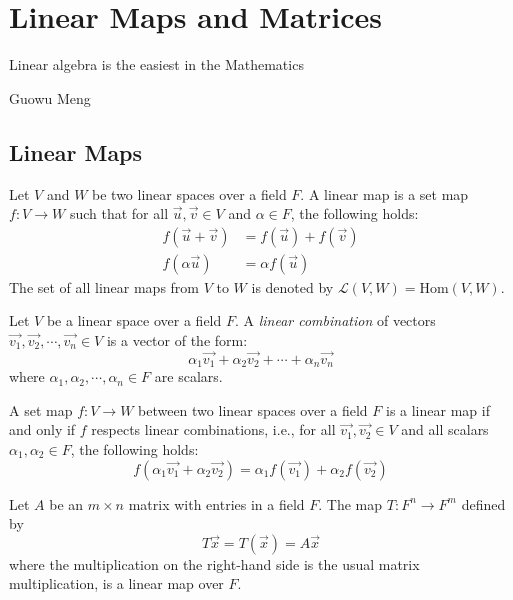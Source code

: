 \documentclass[
	11pt, %
	fleqn, %
	a4paper, %
]{LegrandOrangeBook}
\newcommand{\Hom}[2]{\text{Hom}(#1, #2)} %
\begin{document}
\chapter{Linear Maps and Matrices}

\epigraph{Linear algebra is the easiest in the Mathematics}{Guowu Meng}

\section{Linear Maps}

\begin{definition}
    Let $V$ and $W$ be two linear spaces over a field $F$. A linear map is a set map $f: V \to W$ such that for all $\vec{u}, \vec{v} \in V$ and $\alpha \in F$, the following holds:
    \[
        \begin{split}
            f(\vec{u} + \vec{v}) &= f(\vec{u}) + f(\vec{v}) \\
            f(\alpha \vec{u}) &= \alpha f(\vec{u})
        \end{split}
    \]
    The set of all linear maps from $V$ to $W$ is denoted by $\mathcal{L}(V, W) = \Hom{V}{W}$.
\end{definition}

\begin{definition}
    Let $V$ be a linear space over a field $F$. A \emph{linear combination} of vectors $\vec{v_1}, \vec{v_2}, \cdots, \vec{v_n} \in V$ is a vector of the form:
    \[
        \alpha_1 \vec{v_1} + \alpha_2 \vec{v_2} + \cdots + \alpha_n \vec{v_n}
    \]
    where $\alpha_1, \alpha_2, \cdots, \alpha_n \in F$ are scalars.
\end{definition}

\begin{corollary}
    A set map $f: V \to W$ between two linear spaces over a field $F$ is a linear map if and only if $f$ respects linear combinations, i.e., for all $\vec{v_1}, \vec{v_2} \in V$ and all scalars $\alpha_1, \alpha_2 \in F$, the following holds:
    \[
        f(\alpha_1 \vec{v_1} + \alpha_2 \vec{v_2}) = \alpha_1 f(\vec{v_1}) + \alpha_2 f(\vec{v_2})
    \]
\end{corollary}

\newpage

\begin{example}
    Let $A$ be an $m \times n$ matrix with entries in a field $F$. The map $T: F^n \to F^m$ defined by
    \[
        T\vec{x} = T(\vec{x}) = A \vec{x}
    \]
    where the multiplication on the right-hand side is the usual matrix multiplication, is a linear map over $F$.
\end{example}
\end{document}
